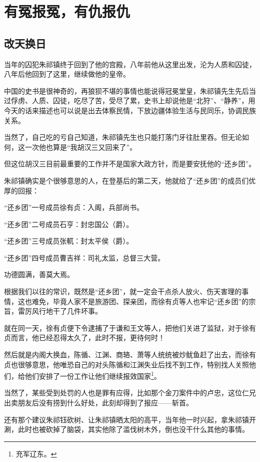 \section{有冤报冤，有仇报仇}
\ifnum{}
	\begin{multicols}{\theparacolNo}
		\fi
		\subsection{改天换日}
		当年的囚犯朱祁镇终于回到了他的宫殿，八年前他从这里出发，沦为人质和囚徒，八年后他回到了这里，继续做他的皇帝。

		中国的史书是很神奇的，再狼狈不堪的事情也能说得冠冕堂皇，朱祁镇先生先后当过俘虏、人质、囚徒，吃尽了苦，受尽了累，史书上却说他是“北狩”、“静养”，用今天的话来描述也可以说是出去体察民情，下放边疆体验生活与民同乐，协调民族关系。

		当然了，自己吃的亏自己知道，朱祁镇先生也只能打落门牙往肚里吞。但无论如何，这一次他也算是“我胡汉三又回来了”。

		但这位胡汉三目前最重要的工作并不是国家大政方针，而是要安抚他的“还乡团”。

		朱祁镇确实是个很够意思的人，在登基后的第二天，他就给了“还乡团”的成员们优厚的回报：

		“还乡团”一号成员徐有贞：入阁，兵部尚书。

		“还乡团”二号成员石亨：封忠国公（爵）。

		“还乡团”三号成员张軏：封太平侯（爵）。

		“还乡团”四号成员曹吉祥：司礼太监，总督三大营。

		功德圆满，善莫大焉。

		根据我们以往的常识，既然是“还乡团”，就一定会干点杀人放火、伤天害理的事情，这也难免，毕竟人家不是旅游团、探亲团，而徐有贞等人也牢记“还乡团”的宗旨，雷厉风行地干了几件坏事。

		就在同一天，徐有贞便下令逮捕了于谦和王文等人，把他们关进了监狱，对于徐有贞而言，他已经忍得太久了，此时不报，更待何时！

		然后就是内阁大换血，陈循、江渊、商辂、萧等人统统被炒鱿鱼赶了出去，而徐有贞也很够意思，他唯恐自己的对头陈循和江渊失业后找不到工作，特别找人关照他们，给他们安排了一份工作让他们继续报效国家\footnote{充军辽东。}。

		当然了，某些受到处罚的人也是罪有应得，比如那个金刀案件中的卢忠，这位仁兄出卖朋友后没有捞到什么好处，此刻却得到了报应——斩首。

		还有那个建议朱祁钰砍树、让朱祁镇晒太阳的高平，当年他一时兴起，拿朱祁镇开涮，此时也被砍掉了脑袋，其实他除了滥伐树木外，倒也没干什么其他的事情。


\end{multicols}
